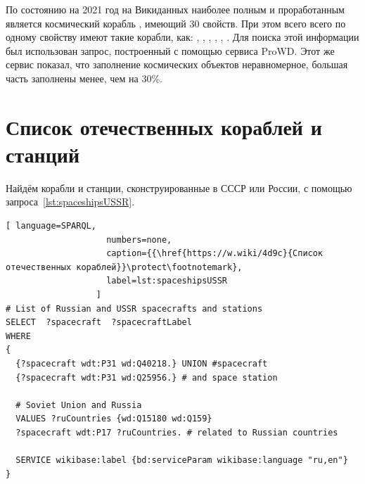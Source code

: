 По состоянию на 2021 год на Викиданных 
наиболее полным и проработанным является космический корабль 
, 
имеющий 30 свойств\autocite{spacecraftProWD}. 
При этом всего всего по одному свойству имеют такие корабли, как: 
, 
, 
, 
, 
, 
\autocite{spacecraftProWD}. 
Для поиска этой информации был использован запрос, построенный с помощью сервиса ProWD\autocite{spacecraftProWD}. 
Этот же сервис показал, что заполнение космических объектов неравномерное, 
большая часть заполнены менее, чем на 30\%\autocite{spacecraftProWD}. 


\section{Список отечественных кораблей и станций}
Найдём корабли и станции, сконструированные в СССР или России, 
с помощью запроса~\ref{lst:spaceshipsUSSR}.

\begin{lstlisting}[ language=SPARQL, 
                    numbers=none, 
                    caption={{\href{https://w.wiki/4d9c}{Список отечественных кораблей}}\protect\footnotemark}, 
                    label=lst:spaceshipsUSSR
                  ]
# List of Russian and USSR spacecrafts and stations
SELECT  ?spacecraft  ?spacecraftLabel 
WHERE
{
  {?spacecraft wdt:P31 wd:Q40218.} UNION #spacecraft
  {?spacecraft wdt:P31 wd:Q25956.} # and space station
  
  # Soviet Union and Russia
  VALUES ?ruCountries {wd:Q15180 wd:Q159}
  ?spacecraft wdt:P17 ?ruCountries. # related to Russian countries
  
  SERVICE wikibase:label {bd:serviceParam wikibase:language "ru,en"}
}
\end{lstlisting}


